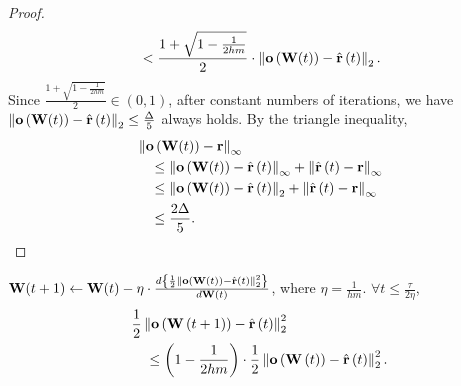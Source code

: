 \begin{proof}
\begin{equation*}
\begin{split}
	&\quad < \frac{1 + \sqrt{1 - \frac{1}{2 h m}}}{2} \cdot \left\| {\mathbf{o}}\left( {\mathbf{W}}(t) \right) - \hat{{\mathbf{r}}}\left(t\right)\right\|_2.
	\end{split}
	\end{equation*}
	Since $\frac{1 + \sqrt{1 - \frac{1}{2 h m}}}{2} \in \left(0, 1\right)$, after constant numbers of iterations, we have $\left\| {\mathbf{o}}\left( {\mathbf{W}}(t) \right) - \hat{{\mathbf{r}}}\left(t\right)\right\|_2 \le \frac{\Delta}{5}$ always holds. By the triangle inequality,
	\begin{equation*}
	\begin{split}
	&\left\| {\mathbf{o}}\left( {\mathbf{W}}(t) \right) - {\mathbf{r}} \right\|_\infty \\
	&\quad \le \left\| {\mathbf{o}}\left( {\mathbf{W}}(t) \right) - \hat{{\mathbf{r}}}\left(t\right)\right\|_\infty + \left\| \hat{{\mathbf{r}}}\left(t\right) - {\mathbf{r}}\right\|_\infty \\
	&\quad \le \left\| {\mathbf{o}}\left( {\mathbf{W}}(t) \right) - \hat{{\mathbf{r}}}\left(t\right)\right\|_2 + \left\| \hat{{\mathbf{r}}}\left(t\right) - {\mathbf{r}}\right\|_\infty \\
	&\quad \le \frac{2 \Delta}{5}. \qedhere
	\end{split}
	\end{equation*}
\end{proof}

\begin{lem}
	\label{lem:logit_l2_loss_parameter_smoothness}
	${\mathbf{W}}(t+1) \leftarrow {\mathbf{W}}(t) - \eta \cdot \frac{d \left\{ \frac{1}{2} \left\| {\mathbf{o}}\left( {\mathbf{W}}\left(t\right)\right) - \hat{{\mathbf{r}}}\left(t\right) \right\|_2^2 \right\}}{d {\mathbf{W}}(t)}$, where $\eta = \frac{1}{h m}$. $\forall t \le \frac{\tau}{2 \eta}$,
	\begin{equation*}
	\begin{split}
	&\frac{1}{2} \left\| {\mathbf{o}}\left( {\mathbf{W}}\left(t+1\right) \right) - \hat{{\mathbf{r}}}\left(t\right) \right\|_2^2 \\
	&\quad \le \left( 1 - \frac{1}{2 h m} \right) \cdot \frac{1}{2} \left\| {\mathbf{o}}\left( {\mathbf{W}}\left(t\right) \right) - \hat{{\mathbf{r}}}\left(t\right) \right\|_2^2.
	\end{split}
	\end{equation*}
\end{lem}